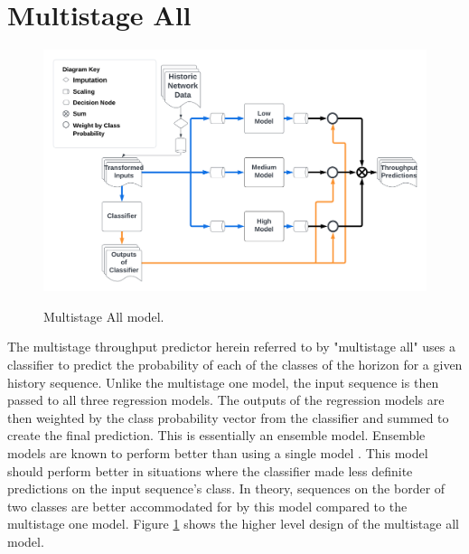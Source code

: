\section{Multistage All}
\begin{figure}[h]
\centering
\includegraphics[scale=0.15]{Multistage All.png}
\label{fig:multistage_all}
\caption{Multistage All model.}
\end{figure}

The multistage throughput predictor herein referred to by "multistage all" uses a classifier to predict the probability of each of the classes of the horizon for a given history sequence. Unlike the multistage one model, the input sequence is then passed to all three regression models. The outputs of the regression models are then weighted by the class probability vector from the classifier and summed to create the final prediction. This is essentially an ensemble model. Ensemble models are known to perform better than using a single model \cite{https://doi.org/10.1002/widm.1249}. This model should perform better in situations where the classifier made less definite predictions on the input sequence's class. In theory, sequences on the border of two classes are better accommodated for by this model compared to the multistage one model. Figure \ref{fig:multistage_all} shows the higher level design of the multistage all model.


